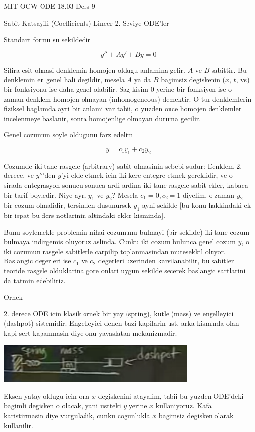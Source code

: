 \documentclass[12pt,fleqn]{article}
\begin{document}
MIT OCW ODE 18.03 Ders 9

Sabit Katsayili (Coefficients) Lineer 2. Seviye ODE'ler 

Standart formu su sekildedir

\[ y'' + Ay' + By = 0 \]

Sifira esit olmasi denklemin homojen oldugu anlamina gelir. $A$ ve $B$
sabittir. Bu denklemin en genel hali degildir, mesela $A$ ya da $B$
bagimsiz degiskenin ($x$, $t$, vs) bir fonksiyonu ise daha genel
olabilir. Sag kisim 0 yerine bir fonksiyon ise o zaman denklem homojen
olmayan (inhomogeneous) demektir. O tur denklemlerin fiziksel baglamda ayri
bir anlami var tabii, o yuzden once homojen denklemler incelenmeye
baslanir, sonra homojenlige olmayan duruma gecilir.

Genel cozumun soyle oldugunu farz edelim

\[ y = c_1 y_1 + c_2 y_2 \]

Cozumde iki tane rasgele (arbitrary) sabit olmasinin sebebi sudur: Denklem
2. derece, ve $y''$'den $y$'yi elde etmek icin iki kere entegre etmek
gereklidir, ve o sirada entegrasyon sonucu sonuca ardi ardina iki tane
rasgele sabit ekler, kabaca bir tarif boyledir. Niye ayri $y_1$ ve $y_2$?
Mesela $c_1 = 0, c_2 = 1$ diyelim, o zaman $y_2$ bir cozum olmalidir,
tersinden dusunursek $y_1$ ayni sekilde [bu konu hakkindaki ek bir ispat
bu ders notlarinin altindaki ekler kisminda]. 

Bunu soylemekle problemin nihai cozumunu bulmayi (bir sekilde) iki tane
cozum bulmaya indirgemis oluyoruz aslinda. Cunku iki cozum bulunca genel
cozum $y$, o iki cozumun rasgele sabitlerle carpilip toplanmasindan
mutesekkil oluyor. Baslangic degerleri ise $c_1$ ve $c_2$ degerleri
uzerinden karsilanabilir, bu sabitler teoride rasgele olduklarina gore
onlari uygun sekilde secerek baslangic sartlarini da tatmin edebiliriz. 

Ornek

2. derece ODE icin klasik ornek bir yay (spring), kutle (mass) ve
engelleyici (dashpot) sistemidir. Engelleyici denen bazi kapilarin ust,
arka kisminda olan kapi sert kapanmasin diye onu yavaslatan mekanizmadir.

\includegraphics[height=2cm]{9_1.png}

Eksen yatay oldugu icin ona $x$ degiskenini atayalim, tabii bu yuzden
ODE'deki bagimli degisken o olacak, yani ustteki $y$ yerine $x$
kullaniyoruz. Kafa karistirmasin diye vurguladik, cunku cogunlukla $x$ bagimsiz
degisken olarak kullanilir. 
\end{document}
